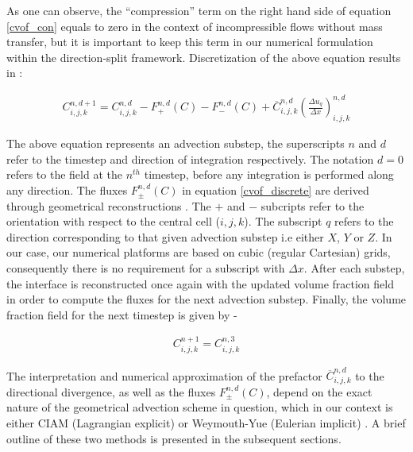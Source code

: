 As one can observe, the ``compression'' term on the right hand side of equation 
\ref{cvof_con} equals to zero in the context of incompressible flows without mass 
transfer, but it is important to keep this term in our numerical formulation within 
the direction-split framework. Discretization of the above equation results in :

\begin{align}
	C_{i,j,k}^{n,d+1} = C_{i,j,k}^{n,d} - F_{+}^{n,d}\left(C \right) - F_{-}^{n,d}\left(C \right) + \overline{C}_{i,j,k}^{n,d}\left(\frac{\Delta u_q}{\Delta x}\right)^{n,d}_{i,j,k}  
  \label{cvof_discrete}
\end{align}

The above equation represents an advection substep, the superscripts $n$ and $d$ refer to the timestep and 
direction of integration respectively. The notation $d=0$ refers to the field 
at the $n^{th}$ timestep, before any integration is performed along any direction. 
The fluxes $F_{\pm}^{n,d}(C)$ in equation \ref{cvof_discrete} are derived through geometrical reconstructions
.
The $+$ and $-$ subcripts refer to the orientation with respect to the central cell ($i,j,k$).
The subscript $q$ refers to the direction corresponding to that given advection substep 
i.e either $X$, $Y$ or $Z$. In our case, our numerical platforms are based on cubic 
(regular Cartesian) grids, consequently there is no requirement for a subscript with $\Delta x$. 
After each substep, the interface is reconstructed once again with the updated 
volume fraction field in order to compute the fluxes for the next advection substep.  
Finally, the volume fraction field for the next timestep is given by -

\begin{align}
	 C^{n+1}_{i,j,k} = C^{n,3}_{i,j,k}  
\end{align}

The interpretation and numerical approximation of the prefactor $\overline{C}_{i,j,k}^{n,d}$ 
to the directional divergence, as well as the fluxes $F_{\pm}^{n,d}(C)$, depend 
on the exact nature of the geometrical advection scheme in question, 
which in our context is either CIAM (Lagrangian explicit) or Weymouth-Yue (Eulerian implicit) 
.
A brief outline of these two methods is presented in the subsequent sections.   

